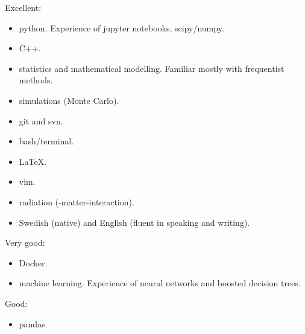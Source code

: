 



\begin{cvskills}



\cvskill
{Excellent:}
{\begin{itemize} \item python. Experience of jupyter notebooks, scipy/numpy.
						 \item C++.
						 \item statistics and mathematical modelling. Familiar mostly with frequentist methods.
						 \item simulations (Monte Carlo).
						 \item git and svn.
						 \item bash/terminal.
						 \item LaTeX.
						 \item vim.
						 \item radiation (-matter-interaction).
						 \item Swedish (native) and English (fluent in speaking and writing).
						  \end{itemize}} %

\cvskill
{Very good:}
{\begin{itemize} \item Docker.
						\item machine learning. Experience of neural networks and boosted decision trees.
						\end{itemize}} %

\cvskill
{Good:}
{\begin{itemize} \item pandas.
						\end{itemize}}





\end{cvskills}